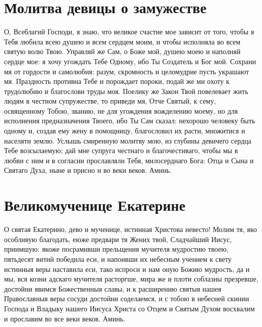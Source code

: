 \section{Молитва девицы о замужестве}

\begin{mymulticols}

О, Всеблагий Господи, я знаю, что великое счастие мое зависит от того, чтобы я Тебя любила всею душею и всем сердцем моим, и чтобы исполняла во всем святую волю Твою. Управляй же Сам, о Боже мой, душею моею и наполняй сердце мое: я хочу угождать Тебе Одному, ибо Ты Создатель и Бог мой. Сохрани мя от гордости и самолюбия: разум, скромность и целомудрие пусть украшают мя. Праздность противна Тебе и порождает пороки, подай же ми охоту к трудолюбию и благослови труды моя. Поелику же Закон Твой повелевает жить людям в честном супружестве, то приведи мя, Отче Святый, к сему, освященному Тобою, званию, не для угождения вожделению моему, но для исполнения предназначения Твоего, ибо Ты Сам сказал: нехорошо человеку быть одному и, создав ему жену в помощницу, благословил их расти, множитися и населяти землю. Услышь смиренную молитву мою, из глубины девичего сердца Тебе возсылаемую; дай мне супруга честнаго и благочестиваго, чтобы мы в любви с ним и в согласии прославляли Тебя, милосерднаго Бога: Отца и Сына и Святаго Духа, ныне и присно и во веки веков. Аминь.

\end{mymulticols}

\newpage
\vspace{-\baselineskip}
\section{Великомученице Екатерине}\begin{mymulticols}



О святая Екатерино, дево и мученице, истинная Христова невесто! Молим тя, яко особливую благодать, еюже предвари тя Жених твой, Сладчайший Иисус, приимшую: якоже посрамивши прельщения мучителя мудростию твоею, пятьдесят витий победила еси, и напоивши их небесным учением к свету истинныя веры наставила еси, тако испроси и нам оную Божию мудрость, да и мы, вся козни адскаго мучителя расторгше, мира же и плоти соблазны презревше, достойни явимся Божественныя славы, и к расширению святыя нашея Православныя веры сосуди достойни соделаемся, и с тобою в небесней скинии Господа и Владыку нашего Иисуса Христа со Отцем и Святым Духом восхвалим и прославим во все веки веков. Аминь.

\end{mymulticols}
\vspace{-2\baselineskip}
\longpage{}
